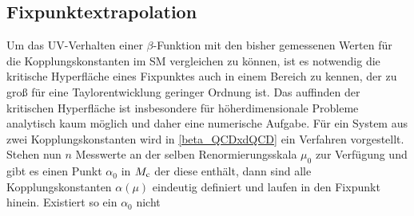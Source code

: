   \subsection{Fixpunktextrapolation}
    Um das UV-Verhalten einer $\beta$-Funktion mit den bisher gemessenen Werten für die 
    Kopplungskonstanten im SM vergleichen zu können, ist es notwendig die kritische Hyperfläche 
    eines Fixpunktes auch in einem Bereich zu kennen, der zu groß für eine Taylorentwicklung 
    geringer Ordnung ist. Das auffinden der kritischen Hyperfläche ist insbesondere für 
    höherdimensionale Probleme analytisch kaum möglich und daher eine numerische Aufgabe. Für 
    ein System aus zwei Kopplungskonstanten wird in \ref{beta_QCDxdQCD} ein Verfahren 
    vorgestellt.
    Stehen nun $n$ Messwerte an der selben Renormierungsskala 
    $\mu_0$ zur Verfügung und gibt es einen Punkt $\alpha_0$ in $M_\text{c}$ der diese enthält, 
    dann sind alle Kopplungskonstanten $\alpha(\mu)$ eindeutig definiert und laufen in den 
    Fixpunkt hinein. Existiert so ein $\alpha_0$ nicht

    

  
    



      


  
  
  
  
